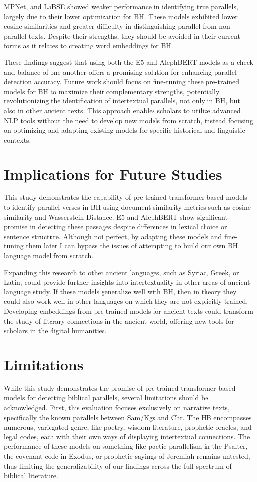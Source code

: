 \documentclass[12pt]{article}
\begin{document}
MPNet, and LaBSE showed weaker performance in identifying true parallels, largely due to their lower optimization for BH. These models exhibited lower cosine similarities and greater difficulty in distinguishing parallel from non-parallel texts. Despite their strengths, they should be avoided in their current forms as it relates to creating word embeddings for BH.

These findings suggest that using both the E5 and AlephBERT models as a check and balance of one another offers a promising solution for enhancing parallel detection accuracy. Future work should focus on fine-tuning these pre-trained models for BH to maximize their complementary strengths, potentially revolutionizing the identification of intertextual parallels, not only in BH, but also in other ancient texts. This approach enables scholars to utilize advanced NLP tools without the need to develop new models from scratch, instead focusing on optimizing and adapting existing models for specific historical and linguistic contexts.

\section{Implications for Future Studies}
This study demonstrates the capability of pre-trained transformer-based models to identify parallel verses in BH using document similarity metrics such as cosine similarity and Wasserstein Distance. E5 and AlephBERT show significant promise in detecting these passages despite differences in lexical choice or sentence structure. Although not perfect, by adapting these models and fine-tuning them later I can bypass the issues of attempting to build our own BH language model from scratch.

Expanding this research to other ancient languages, such as Syriac, Greek, or Latin, could provide further insights into intertextuality in other areas of ancient language study. If these models generalize well with BH, then in theory they could also work well in other languages on which they are not explicitly trained.  Developing embeddings from pre-trained models for ancient texts could transform the study of literary connections in the ancient world, offering new tools for scholars in the digital humanities.

\section{Limitations}
While this study demonstrates the promise of pre-trained transformer-based models for detecting biblical parallels, several limitations should be acknowledged. First, this evaluation focuses exclusively on narrative texts, specifically the known parallels between Sam/Kgs and Chr. The HB encompasses numerous, variegated genre, like poetry, wisdom literature, prophetic oracles, and legal codes, each with their own ways of displaying intertextual connections. The performance of these models on something like poetic parallelism in the Psalter, the covenant code in Exodus, or prophetic sayings of Jeremiah remains untested, thus limiting the generalizability of our findings across the full spectrum of biblical literature.
\end{document}
